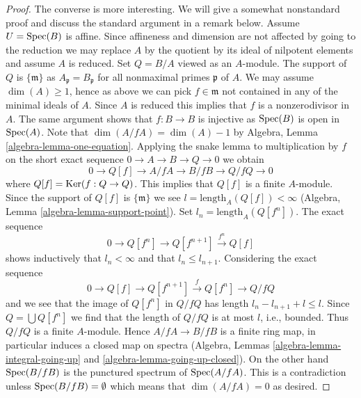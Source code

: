 \begin{proof}
\medskip\noindent
The converse is more interesting. We will give a somewhat nonstandard proof
and discuss the standard argument in a remark below.
Assume $U = \mathop{\mathrm{Spec}}(B)$ is affine. Since affineness and dimension are not
affected by going to the reduction we may replace $A$ by the quotient by
its ideal of nilpotent elements and assume $A$ is reduced.
Set $Q = B/A$ viewed as an $A$-module.
The support of $Q$ is $\{\mathfrak m\}$ as $A_\mathfrak p = B_\mathfrak p$
for all nonmaximal primes $\mathfrak p$ of $A$.
We may assume $\dim(A) \geq 1$, hence as above we can pick
$f \in \mathfrak m$ not contained in any of the minimal ideals of $A$.
Since $A$ is reduced this implies that $f$ is a nonzerodivisor in $A$.
The same argument shows that $f : B \to B$ is injective as $\mathop{\mathrm{Spec}}(B)$
is open in $\mathop{\mathrm{Spec}}(A)$. Note that $\dim(A/fA) = \dim(A) - 1$ by
Algebra, Lemma \ref{algebra-lemma-one-equation}.
Applying the snake lemma to multiplication by $f$ on the short
exact sequence $0 \to A \to B \to Q \to 0$ we obtain
$$
0 \to Q[f] \to A/fA \to B/fB \to Q/fQ \to 0
$$
where $Q[f] = \mathop{\mathrm{Ker}}(f : Q \to Q)$.
This implies that $Q[f]$ is a finite $A$-module. Since the support of
$Q[f]$ is $\{\mathfrak m\}$ we see $l = \text{length}_A(Q[f]) < \infty$
(Algebra, Lemma \ref{algebra-lemma-support-point}).
Set $l_n = \text{length}_A(Q[f^n])$. The exact sequence
$$
0 \to Q[f^n] \to Q[f^{n + 1}] \xrightarrow{f^n} Q[f]
$$
shows inductively that $l_n < \infty$ and that $l_n \leq l_{n + 1}$.
Considering the exact sequence
$$
0 \to Q[f] \to Q[f^{n + 1}] \xrightarrow{f} Q[f^n] \to Q/fQ
$$
and we see that the image of $Q[f^n]$ in $Q/fQ$ has length
$l_n - l_{n + 1} + l \leq l$. Since $Q = \bigcup Q[f^n]$ we
find that the length of $Q/fQ$ is at most $l$, i.e., bounded.
Thus $Q/fQ$ is a finite $A$-module. Hence $A/fA \to B/fB$ is a
finite ring map, in particular induces a closed map on spectra
(Algebra, Lemmas \ref{algebra-lemma-integral-going-up} and
\ref{algebra-lemma-going-up-closed}).
On the other hand $\mathop{\mathrm{Spec}}(B/fB)$ is the punctured spectrum of $\mathop{\mathrm{Spec}}(A/fA)$.
This is a contradiction unless $\mathop{\mathrm{Spec}}(B/fB) = \emptyset$ which
means that $\dim(A/fA) = 0$ as desired.
\end{proof}

